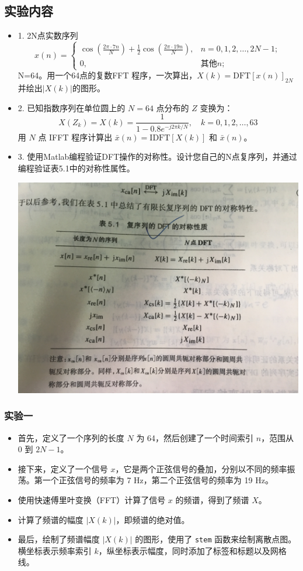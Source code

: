 \documentclass[a4paper,12pt]{article}
\begin{document}
\subsection{实验内容}
\begin{itemize}
    \item 1. 2N点实数序列
\[
x(n) = 
\begin{cases} 
\cos\left(\frac{2\pi \cdot 7n}{N}\right) + \frac{1}{2} \cos\left(\frac{2\pi \cdot 19n}{N}\right), & n = 0,1,2,\ldots,2N-1; \\
0, & \text{其他} n;
\end{cases}
\]
N=64。用一个64点的复数FFT 程序，一次算出，$X(k) = \text{DFT}[x(n)]_{2N}$并绘出$|X(k)|$的图形。

    \item 2. 已知指数序列在单位圆上的 $N=64$ 点分布的 $Z$ 变换为：
\[
X(Z_k) = X(k) = \frac{1}{1 - 0.8e^{-j2\pi k/N}}, \quad k = 0,1,2,\ldots,63
\]
用 $N$ 点 IFFT 程序计算出 $\bar{x}(n) = \text{IDFT}[X(k)]$ 和 $\bar{x}(n)$。

    \item 3. 使用Matlab编程验证DFT操作的对称性。设计您自己的N点复序列，并通过编程验证表5.1中的对称性属性。
    
    \centering 
\includegraphics[width=0.8\linewidth]{images/2_Verify/Question.png}
\justifying

\end{itemize}

\subsubsection{实验一}
\begin{itemize}
\item 首先，定义了一个序列的长度 $N$ 为 64，然后创建了一个时间索引 $n$，范围从 0 到 $2N-1$。
\item 接下来，定义了一个信号 $x$，它是两个正弦信号的叠加，分别以不同的频率振荡。第一个正弦信号的频率为 7 Hz，第二个正弦信号的频率为 19 Hz。
\item 使用快速傅里叶变换（FFT）计算了信号 $x$ 的频谱，得到了频谱 $X$。
\item 计算了频谱的幅度 $|X(k)|$，即频谱的绝对值。
\item 最后，绘制了频谱幅度 $|X(k)|$ 的图形，使用了 \texttt{stem} 函数来绘制离散点图。横坐标表示频率索引 $k$，纵坐标表示幅度，同时添加了标签和标题以及网格线。
\end{itemize}
\end{document}
